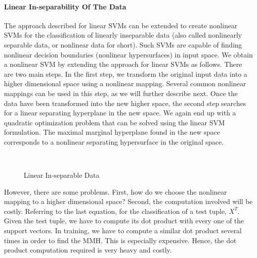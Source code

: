 \documentclass[12pt,fleqn]{book} %
\begin{document}
\paragraph{Linear In-separability Of The Data}
The approach described for linear SVMs can be extended to create nonlinear SVMs for the classification of linearly inseparable data (also called nonlinearly separable data, or nonlinear data for short). Such SVMs are capable of finding nonlinear decision boundaries (nonlinear hypersurfaces) in input space. We obtain a nonlinear SVM by extending the approach for linear SVMs as follows. There are two main steps. In the first step, we transform the original input data into a higher dimensional space using a nonlinear mapping. Several common nonlinear mappings can be used in this step, as we will further describe next. Once the data have been transformed into the new higher space, the second step searches for a linear separating hyperplane in the new space. We again end up with a quadratic optimization problem that can be solved using the linear SVM formulation. The maximal marginal hyperplane found in the new space corresponds to a nonlinear separating hypersurface in the original space.\bigskip
\begin{figure}[h]
\begin{dBox}
\centering
  \mbox{
   }
   \caption{Linear In-separable Data\label{fig:svm4} }   
\end{dBox}   
\end{figure}

However, there are some problems. First, how do we choose the nonlinear mapping to a higher dimensional space? Second, the computation involved will be costly. Referring to the last equation, for the classification of a test tuple, $X^T$. Given the test tuple, we have to compute its dot product with every one of the support vectors. In training, we have to compute a similar dot product several times in order to find the MMH. This is especially expensive. Hence, the dot product computation required is very heavy and costly.\bigskip
\end{document}
